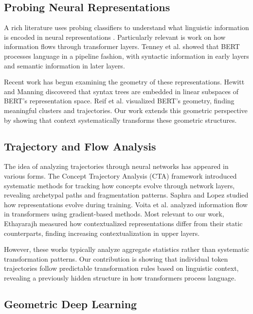 \documentclass[11pt]{article}
\begin{document}
\subsection{Probing Neural Representations}

A rich literature uses probing classifiers to understand what linguistic information is encoded in neural representations \cite{conneau2018probing, hewitt2019structural}. Particularly relevant is work on how information flows through transformer layers. Tenney et al. \cite{tenney2019bert} showed that BERT processes language in a pipeline fashion, with syntactic information in early layers and semantic information in later layers.

Recent work has begun examining the geometry of these representations. Hewitt and Manning \cite{hewitt2019structural} discovered that syntax trees are embedded in linear subspaces of BERT's representation space. Reif et al. \cite{reif2019visualizing} visualized BERT's geometry, finding meaningful clusters and trajectories. Our work extends this geometric perspective by showing that context systematically transforms these geometric structures.

\subsection{Trajectory and Flow Analysis}

The idea of analyzing trajectories through neural networks has appeared in various forms. The Concept Trajectory Analysis (CTA) framework \cite{smigaj2024cta} introduced systematic methods for tracking how concepts evolve through network layers, revealing archetypal paths and fragmentation patterns. Saphra and Lopez \cite{saphra2019understanding} studied how representations evolve during training. Voita et al. \cite{voita2019bottom} analyzed information flow in transformers using gradient-based methods. Most relevant to our work, Ethayarajh \cite{ethayarajh2019contextual} measured how contextualized representations differ from their static counterparts, finding increasing contextualization in upper layers.

However, these works typically analyze aggregate statistics rather than systematic transformation patterns. Our contribution is showing that individual token trajectories follow predictable transformation rules based on linguistic context, revealing a previously hidden structure in how transformers process language.

\subsection{Geometric Deep Learning}
\end{document}
